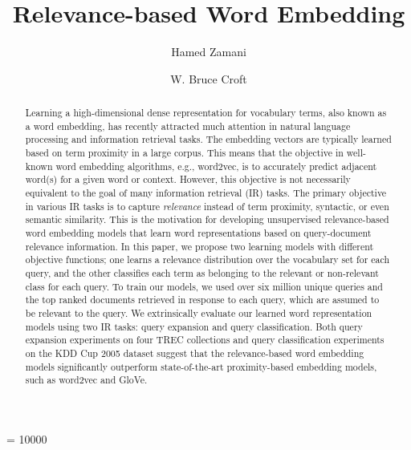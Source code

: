\documentclass[sigconf]{acmart}
\begin{document}
\widowpenalty = 10000

\title{Relevance-based Word Embedding}

\author{Hamed Zamani}

\author{W. Bruce Croft}

\begin{abstract}
Learning a high-dimensional dense representation for vocabulary terms, also known as a word embedding, has recently attracted much attention in natural language processing and information retrieval tasks. The embedding vectors are typically learned based on term proximity in a large corpus. This means that the objective in well-known word embedding algorithms, e.g., word2vec, is to accurately predict adjacent word(s) for a given word or context. However, this objective is not necessarily equivalent to the goal of many information retrieval (IR) tasks. The primary objective in various IR tasks is to capture \textit{relevance} instead of term proximity, syntactic, or even semantic similarity. This is the motivation for developing unsupervised relevance-based word embedding models that learn word representations based on query-document relevance information. In this paper, we propose two learning models with different objective functions; one learns a relevance distribution over the vocabulary set for each query, and the other classifies each term as belonging to the relevant or non-relevant class for each query. To train our models, we used over six million unique queries and the top ranked documents retrieved in response to each query, which are assumed to be relevant to the query. We extrinsically evaluate our learned word representation models using two IR tasks: query expansion and query classification. Both query expansion experiments on four TREC collections and query classification experiments on the KDD Cup 2005 dataset suggest that the relevance-based word embedding models significantly outperform state-of-the-art proximity-based embedding models, such as word2vec and GloVe.

\end{abstract}
\end{document}
